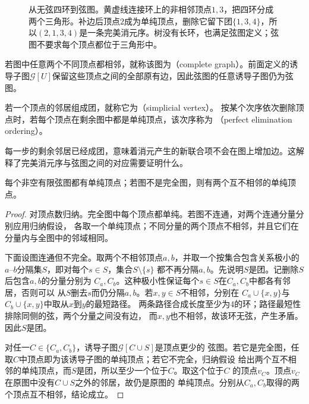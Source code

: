 \begin{figure}[htbp]
  \centering
  
  \caption{从无弦四环到弦图。黄虚线连接环上的非相邻顶点\(1,3\)，把四环分成两个三角形。补边后顶点\(2\)成为单纯顶点，删除它留下团\(\{1,3,4\}\)，所以\((2,1,3,4)\)是一条完美消元序。树没有长环，也满足弦图定义；弦图不要求每个顶点都位于三角形中。}
  \label{fig:graph-theory-chordal-cycle}
\end{figure}

若图中任意两个不同顶点都相邻，就称该图为（complete graph）。前面定义的诱导子图\(\mathcal G[U]\)保留这些顶点之间的全部原有边，因此弦图的任意诱导子图仍为弦图。

\begin{definition}[单纯顶点与完美消元序]
\label{def:graph-theory-perfect-elimination}
若一个顶点的邻居组成团，就称它为（simplicial vertex）。
按某个次序依次删除顶点时，若每个顶点在剩余图中都是单纯顶点，该次序称为
（perfect elimination ordering）。
\end{definition}

每一步的剩余邻居已经成团，意味着消元产生的新联合项不会在图上增加边。这解释了完美消元序与弦图之间的对应需要证明什么。

\begin{lemma}[弦图的单纯顶点]
  \label{lem:graph-theory-chordal-simplicial-vertex}
  每个非空有限弦图都有单纯顶点；若图不是完全图，则有两个互不相邻的单纯顶点。
\end{lemma}

\begin{proof}
对顶点数归纳。完全图中每个顶点都单纯。若图不连通，对两个连通分量分别应用归纳假设，
各取一个单纯顶点；不同分量的两个顶点不相邻，并且它们在分量内与全图中的邻域相同。

下面设图连通但不完全。取两个不相邻顶点\(a,b\)，并取一个按集合包含关系极小的
\(a\)--\(b\)分隔集\(S\)，即对每个\(s\in S\)，集合\(S\setminus\{s\}\)
都不再分隔\(a,b\)。先说明\(S\)是团。记删除\(S\)后包含\(a,b\)的分量分别为
\(C_a,C_b\)。这种极小性保证每个\(s\in S\)在\(C_a,C_b\)中都各有邻居，否则可以
从\(S\)删去\(s\)而仍分隔\(a,b\)。若\(x,y\in S\)不相邻，分别在
\(C_a\cup\{x,y\}\)与\(C_b\cup\{x,y\}\)中取从\(x\)到\(y\)的最短路径。
两条路径合成长度至少为\(4\)的环；路径最短性排除同侧的弦，两个分量之间没有边，
而\(x,y\)也不相邻，故该环无弦，产生矛盾。因此\(S\)是团。

对任一\(C\in\{C_a,C_b\}\)，诱导子图\(\mathcal{G}[C\cup S]\)是顶点更少的
弦图。若它是完全图，任取\(C\)中顶点即为该诱导子图的单纯顶点；若它不完全，归纳假设
给出两个互不相邻的单纯顶点，而\(S\)是团，所以至少一个位于\(C\)。取这个位于\(C\)
的顶点\(v_C\)。顶点\(v_C\)在原图中没有\(C\cup S\)之外的邻居，故仍是原图的
单纯顶点。分别从\(C_a,C_b\)取得的两个顶点互不相邻，结论成立。
\end{proof}


